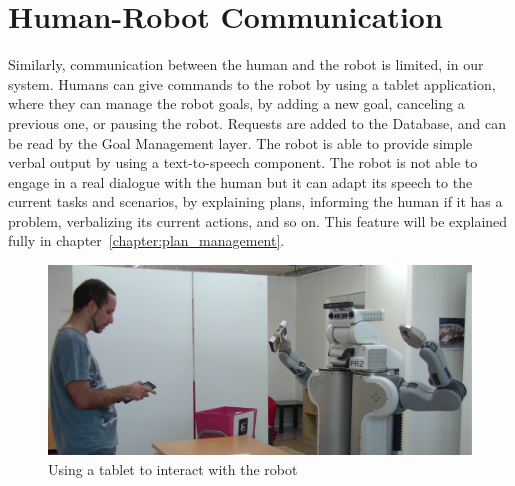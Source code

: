 \section{Human-Robot Communication}
\label{sec:situation_assessment-communication}

Similarly, communication between the human and the robot is limited, in our system. Humans can give commands to the robot by using a tablet application, where they can manage the robot goals, by adding a new goal, canceling a previous one, or pausing the robot. Requests are added to the Database, and can be read by the Goal Management layer. The robot is able to provide simple verbal output by using a text-to-speech component. The robot is not able to engage in a real dialogue with the human but it can adapt its speech to the current tasks and scenarios, by explaining plans, informing the human if it has a problem, verbalizing its current actions, and so on. This feature will be explained fully in chapter~\ref{chapter:plan_management}. 

 \begin{figure}[ht!]
	\centering
	\includegraphics[scale=0.2]{img/situation_assessment/tablet.pdf}
	\caption{Using a tablet to interact with the robot}
	\label{fig:situation_assessment-explore}
\end{figure}

